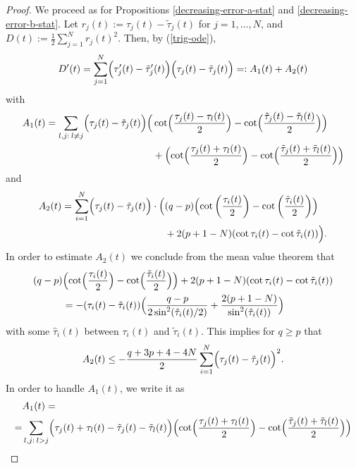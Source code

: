 \documentclass[reqno]{amsart}
\theoremstyle{plain}
\theoremstyle{definition}
\numberwithin{equation}{section}
\begin{document}
 \begin{proof} We proceed as for  Propositions \ref{decreasing-error-a-stat} and \ref{decreasing-error-b-stat}.
   Let $r_j(t):=\tau_j(t)-\tilde \tau_j(t)$ for $j=1,\ldots,N$, and $D(t):=\frac{1}{2}\sum_{j=1}^N r_j(t)^2$.
   Then,  by (\ref{trig-ode}),
\begin{equation}
  D^\prime(t) = 
  \sum_{j=1}^N\Bigl( \tau_j^\prime(t)- \tilde \tau_j^\prime(t)\Bigr)\Bigl( \tau_j(t)- \tilde \tau_j(t)\Bigr)
=:  A_1(t)+A_2(t) \end{equation}
with
\begin{align}
A_1(t)= \sum_{l,j: \> l\ne j}\Bigl( \tau_j(t)- \tilde \tau_j(t)\Bigr)\Bigl(&\cot\Bigl(\frac{\tau_j(t)-\tau_l(t)}{2}\Bigr)-
\cot\Bigl(\frac{\tilde \tau_j(t)-\tilde \tau_l(t)}{2}\Bigr)\Bigr)\notag\\
&+\Bigl(\cot\Bigl(\frac{\tau_j(t)+\tau_l(t)}{2}\Bigr)-
\cot\Bigl(\frac{\tilde \tau_j(t)+\tilde \tau_l(t)}{2}\Bigr)\Bigr)\notag
\end{align}
and
\begin{align}
  A_2(t)=\sum_{i=1}^N \Bigl( \tau_j(t)- \tilde \tau_j(t)\Bigr)
  \cdot\Bigl( &(q-p)\Bigl(\cot\left(\frac{\tau_i(t)}{2}\right)-\cot\left(\frac{\tilde\tau_i(t)}{2}\right)\Bigr)\notag\\
&+2(p+1-N)(\cot\tau_i(t) -\cot\tilde\tau_i(t))\Bigr).
\notag
\end{align}
In order to estimate  $A_2(t)$ we conclude from the mean value theorem that
\begin{align}\label{sine-estimate}
(q-p)&\Bigl(\cot\Bigl(\frac{\tau_i(t)}{2}\Bigr)-\cot\Bigl(\frac{\tilde\tau_i(t)}{2}\Bigr)\Bigr)
+2(p+1-N)(\cot\tau_i(t) -\cot\tilde\tau_i(t))\notag\\
&= -(\tau_i(t)-\tilde\tau_i(t))\Bigl(\frac{q-p}{2\sin^2 (\hat\tau_i(t)/2)} + \frac{2(p+1-N)}{\sin^2 (\hat\tau_i(t))}\Bigr)
\end{align}
with some $\hat\tau_i(t)$ between $\tau_i(t)$ and  $\tilde\tau_i(t)$. This implies for $q\ge p$ that
\begin{equation}\label{est-jacobi-a2}  A_2(t)\le -\frac{q+3p+4-4N}{2}\sum_{i=1}^N \Bigl( \tau_j(t)- \tilde \tau_j(t)\Bigr)^2.
\end{equation}
In order to handle  $A_1(t)$, we write it as
\begin{align}
 & A_1(t)= \notag\\ =& 
  \sum_{l,j: \> l> j}\Bigl( \tau_j(t)+ \tau_l(t) -\tilde \tau_j(t)-\tilde \tau_l(t)\Bigr)
 \Bigl(\cot\Bigl(\frac{\tau_j(t)+\tau_l(t)}{2}\Bigr)-
\cot\Bigl(\frac{\tilde \tau_j(t)+\tilde \tau_l(t)}{2}\Bigr)\Bigr)\notag\\

\end{align}
\end{proof}
\end{document}
